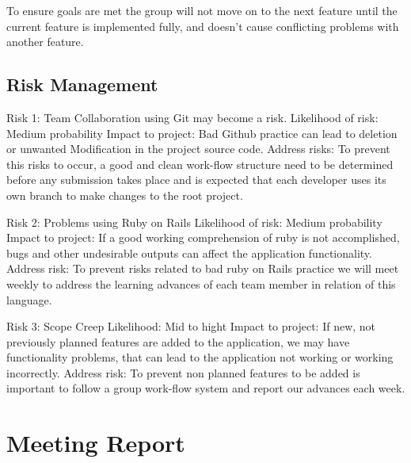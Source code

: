 \documentclass[a4paper]{article}
\begin{document}
\noindent To ensure goals are met the group will not move on to the next feature until the current feature is implemented fully, and doesn't cause conflicting problems with another feature.

\subsection{Risk Management} 

Risk 1: Team Collaboration using Git may become a risk.\newline
Likelihood of risk: Medium probability \newline
Impact to project: Bad Github practice can lead to deletion or unwanted Modification in the project source code.\newline
Address risks: To prevent this risks to occur, a good and clean work-flow structure need to be determined before any submission takes place and is expected that each developer uses its own branch to make changes to the root project.\newline

\noindent Risk 2: Problems using Ruby on Rails \newline
Likelihood of risk: Medium probability\newline
Impact to project: If a good working comprehension of ruby is not accomplished, bugs and other undesirable outputs can affect the application functionality.\newline 
Address risk: To prevent risks related to bad ruby on Rails practice we will meet weekly to address the learning advances of each team member in relation of this language.\newline

\noindent Risk 3: Scope Creep\newline
Likelihood: Mid to hight \newline
Impact to project: If new, not previously planned features are added to the application, we may have functionality problems, that can lead to the application not working or working incorrectly.\newline 
Address risk: To prevent non planned features to be added is important to follow a group work-flow system and report our advances each week.

\section{Meeting Report}
\end{document}
